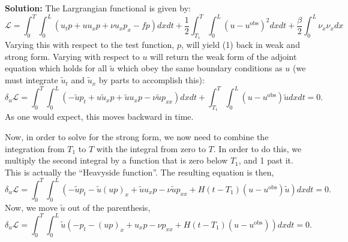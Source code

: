 \documentclass[11pt]{article}
\newenvironment{solution}{\begin{trivlist}\item[]{\bf Solution:}}
                      {\end{trivlist}}
\begin{document}
\begin{enumerate}
\begin{solution}
The Largrangian functional is given by: 
\begin{equation}
\mathcal{L} = \int_0^T \int_0^L (u_t p + u u_x p + \nu u_{x} p_x - f p) dx dt
+ \frac{1}{2}\int_{T_1}^T\int_0^L(u-u^{\text{obs}})^2dxdt  
+ \frac{\beta}{2} \int_0^L \nu_x \nu_x dx  
\label{lagrangian}
\end{equation}
Varying this with respect to the test function, $p$, will yield (1) back
 in weak and strong form. Varying with respect to $u$ will return the
 weak form of the adjoint equation which holds for all $\tilde{u}$ which
 obey the same boundary conditions as $u$ (we must integrate $\tilde u_t$
 and $\tilde u_x$ by parts to accomplish this):   
\begin{equation}
\delta_u \mathcal{L} = \int_0^T\int_0^L\left(-\tilde{u} p_t +
					u\tilde{u}_x p + \tilde{u}u_x p  
		 - \nu\tilde{u} p_{xx}\right)dxdt  
+ \int_{T_1}^T\int_0^L(u-u^{\text{obs}})\tilde{u}dxdt = 0.
\end{equation}
As one would expect, this moves backward in time. 


 Now, in order to solve for the strong form, we now need to combine the
 integration from $T_1$ to $T$ with the integral from zero to $T$. In
 order to do this, we multiply the second integral by a function that is
 zero below $T_1$, and 1 past it. This is actually the ``Heavyside
 function''. The resulting equation is then, 
\begin{equation}
\delta_u \mathcal{L} = \int_0^T\int_0^L \left( -\tilde{u} p_t -
					\tilde{u}(u p)_x + \tilde{u}u_x p  
		 - \nu\tilde{u} p_{xx}
+ H(t-T_1)(u-u^{\text{obs}})\tilde{u} \right)dxdt = 0.
\end{equation}
Now, we move $\tilde u$ out of the parenthesis, 
\begin{equation}
\delta_u \mathcal{L} = \int_0^T\int_0^L \tilde u \left( - p_t -
					(u p)_x + u_x p  
		 - \nu p_{xx}
+ H(t-T_1)(u-u^{\text{obs}}) \right) dxdt = 0.
\end{equation}
\end{solution}
\end{enumerate}
\end{document}
